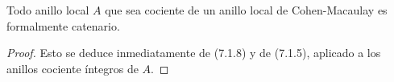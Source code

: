 \begin{proposition}[7.1.10]
\label{IV.2.s7.1.10-fr}
Todo anillo local $A$ que sea cociente de un anillo
local de Cohen-Macaulay es formalmente catenario.
\end{proposition}

\begin{proof}
Esto se deduce inmediatamente de (7.1.8) y de
(7.1.5), aplicado a los anillos cociente íntegros
de $A$.
\end{proof}
